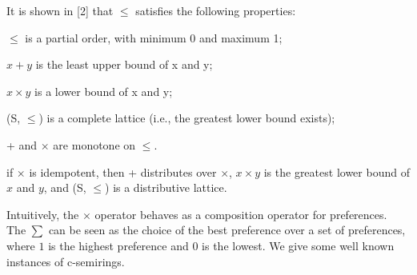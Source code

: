 It is shown in [2] that $\leq$ satisfies the following properties:
\begin{list}{-}{ }
	\item $\leq$ is a partial order, with minimum 0 and maximum 1;
	\item $x + y$ is the least upper bound of x and y;
	\item $x \times y$ is a lower bound of x and y;
	\item (S, $\leq $) is a complete lattice (i.e., the greatest lower bound exists);
	\item + and $\times $ are monotone on $\leq$.
	\item if $\times $ is idempotent, then + distributes over $\times $, $x \times y$ is the greatest lower bound of $x$ and $y$, and (S, $\leq $) is a distributive lattice.
\end{list} 

Intuitively, the $\times$ operator behaves as a composition operator for preferences. The $\sum$ can be seen as the choice of the best preference over a set of preferences, where $1$ is the highest preference and $0$ is the lowest. We give some well known instances of c-semirings.